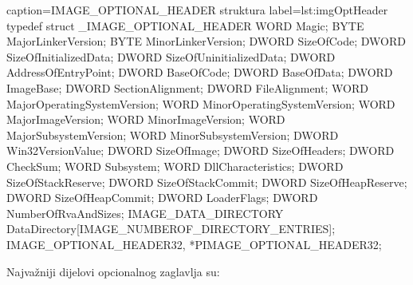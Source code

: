 \documentclass[times, utf8, diplomski, numeric]{fer}
\begin{document}

\begin{struktura} {caption=IMAGE\_OPTIONAL\_HEADER struktura} {label=lst:imgOptHeader}
typedef struct _IMAGE_OPTIONAL_HEADER {
	WORD    Magic;
	BYTE    MajorLinkerVersion;
	BYTE    MinorLinkerVersion;
	DWORD   SizeOfCode;
	DWORD   SizeOfInitializedData;
	DWORD   SizeOfUninitializedData;
	DWORD   AddressOfEntryPoint;
	DWORD   BaseOfCode;
	DWORD   BaseOfData;
	DWORD   ImageBase;
	DWORD   SectionAlignment;
	DWORD   FileAlignment;
	WORD    MajorOperatingSystemVersion;
	WORD    MinorOperatingSystemVersion;
	WORD    MajorImageVersion;
	WORD    MinorImageVersion;
	WORD    MajorSubsystemVersion;
	WORD    MinorSubsystemVersion;
	DWORD   Win32VersionValue;
	DWORD   SizeOfImage;
	DWORD   SizeOfHeaders;
	DWORD   CheckSum;
	WORD    Subsystem;
	WORD    DllCharacteristics;
	DWORD   SizeOfStackReserve;
	DWORD   SizeOfStackCommit;
	DWORD   SizeOfHeapReserve;
	DWORD   SizeOfHeapCommit;
	DWORD   LoaderFlags;
	DWORD   NumberOfRvaAndSizes;
	IMAGE_DATA_DIRECTORY DataDirectory[IMAGE_NUMBEROF_DIRECTORY_ENTRIES];
} IMAGE_OPTIONAL_HEADER32, *PIMAGE_OPTIONAL_HEADER32;
\end{struktura}

Najvažniji dijelovi opcionalnog zaglavlja su:
\end{document}

